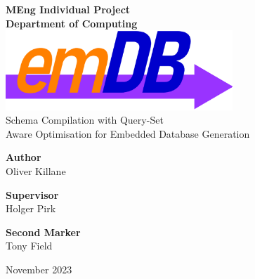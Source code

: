 
\newcommand{\titlecredit}[2]{\begin{minipage}[t]{.3\textwidth}
        \Large
        \centering
        \textbf{#1}
        \\ \vspace{1mm} #2
    \end{minipage}}


\begin{titlepage}
    \begin{center}
        \vspace{4cm}
        \Huge
        \textbf{MEng Individual Project}
        \huge
        \\ \vspace{1mm}
        \textbf{Department of Computing}
        \\ \vspace{40mm}
        \includegraphics[height=30mm]{titlepage/images/emdb_logo.png}
        \\ \HUGE Schema Compilation with Query-Set \\ Aware Optimisation for Embedded Database Generation
        \vspace{35mm}
        \normalsize
        \\ \vspace{3cm}
        \begin{center}
            \titlecredit{Author}{Oliver Killane}
            \titlecredit{Supervisor}{Holger Pirk}
            \titlecredit{Second Marker}{Tony Field}
        \end{center}
        \vspace{5mm}
         November 2023
    \end{center}
\end{titlepage}